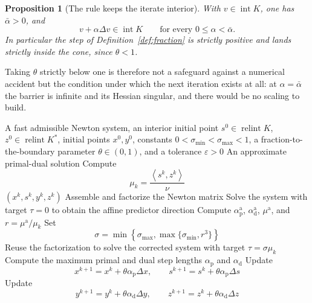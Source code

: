 \documentclass[a4paper,11pt]{book}
\theoremstyle{plain}
\newtheorem{proposition}[theorem]{Proposition}
\theoremstyle{definition}
\theoremstyle{remark}
\numberwithin{equation}{chapter}
\numberwithin{algorithm}{chapter}
\newcommand{\inner}[2]{\left\langle #1, #2 \right\rangle}
\newcommand{\intr}{\operatorname{int}}
\newcommand{\relint}{\operatorname{relint}}
\begin{document}
	\begin{proposition}[The rule keeps the iterate interior]\label{prop:fraction}
		With $v\in\intr K$, one has $\bar\alpha>0$, and
		\begin{equation}
			v+\alpha\Delta v\in\intr K
			\qquad\text{for every }0\leq\alpha<\bar\alpha .
		\end{equation}
		In particular the step of Definition~\ref{def:fraction} is strictly
		positive and lands strictly inside the cone, since $\theta<1$.
	\end{proposition}


	Taking $\theta$ strictly below one is therefore not a safeguard against a
	numerical accident but the condition under which the next iteration exists at
	all: at $\alpha=\bar\alpha$ the barrier is infinite and its Hessian singular,
	and there would be no scaling to build.

	\begin{algorithm}[H]
		\caption{Predictor-corrector method}
		\begin{algorithmic}[1]
			\Require A fast admissible Newton system, an interior initial point
			\(s^0\in\relint K\), \(z^0\in\relint K^*\), initial points \(x^0,y^0\),
			constants \(0<\sigma_{\min}<\sigma_{\max}<1\), a fraction-to-the-boundary
			parameter \(\theta\in(0,1)\), and a tolerance \(\varepsilon>0\)
			\Ensure An approximate primal-dual solution
			\State Compute
			\[
			\mu_k=\frac{\inner{s^k}{z^k}}{\nu}
			\]
			\State \Return \((x^k,s^k,y^k,z^k)\)
			\EndIf
			\State Assemble and factorize the Newton matrix
			\State Solve the system with target \(\tau=0\) to obtain the affine
			predictor direction
			\State Compute
			\(\alpha_{\mathrm p}^{\mathrm a}\),
			\(\alpha_{\mathrm d}^{\mathrm a}\),
			\(\mu^{\mathrm a}\), and
			\(r=\mu^{\mathrm a}/\mu_k\)
			\State Set
			\[
			\sigma
			=
			\min
			\left\{
			\sigma_{\max},
			\max\{\sigma_{\min},r^3\}
			\right\}
			\]
			\State Reuse the factorization to solve the corrected system with target
			\(\tau=\sigma\mu_k\)
			\State Compute the maximum primal and dual step lengths
			\(\alpha_{\mathrm p}\) and \(\alpha_{\mathrm d}\)
			\State Update
			\[
			x^{k+1}
			=
			x^k+\theta\alpha_{\mathrm p}\Delta x,
			\qquad
			s^{k+1}
			=
			s^k+\theta\alpha_{\mathrm p}\Delta s
			\]
			\State Update
			\[
			y^{k+1}
			=
			y^k+\theta\alpha_{\mathrm d}\Delta y,
			\qquad
			z^{k+1}
			=
			z^k+\theta\alpha_{\mathrm d}\Delta z
			\]
			\EndFor
		\end{algorithmic}
	\end{algorithm}
	
\end{document}
